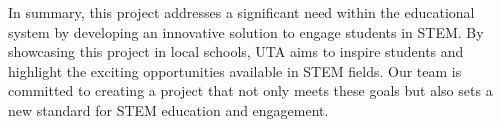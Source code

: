 In summary, this project addresses a significant need within the educational system by developing an innovative solution to engage students in STEM. By showcasing this project in local schools, UTA aims to inspire students and highlight the exciting opportunities available in STEM fields. Our team is committed to creating a project that not only meets these goals but also sets a new standard for STEM education and engagement.
